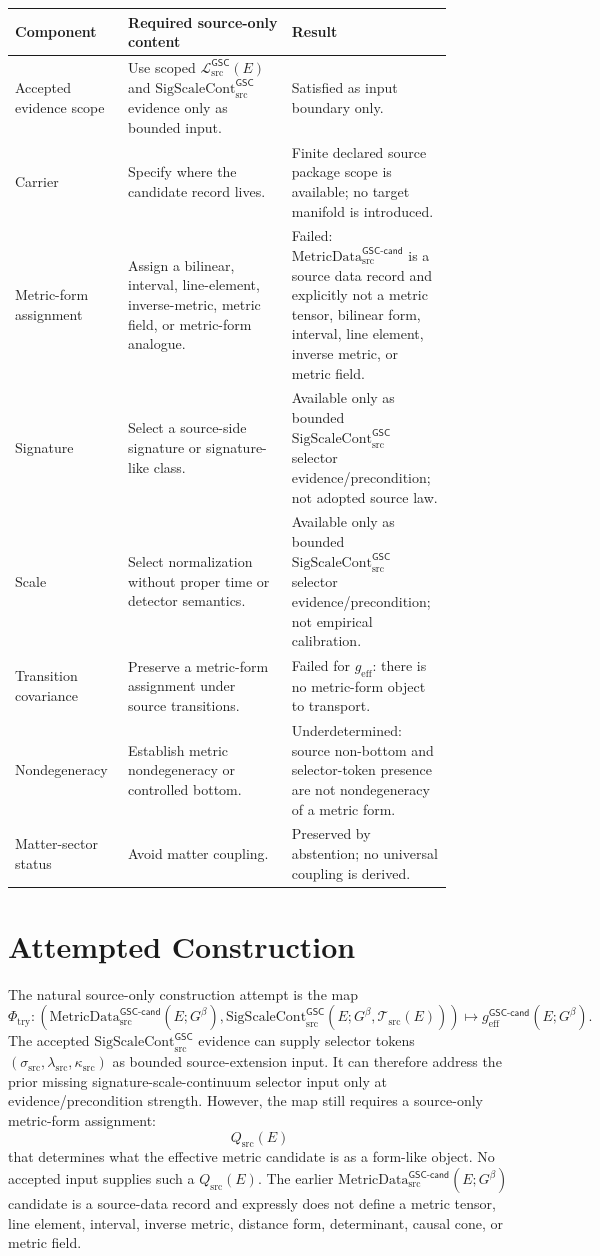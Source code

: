 \documentclass[11pt]{article}
\newcommand{\MetricDataCand}{\mathrm{MetricData}_{\mathrm{src}}^{\mathsf{GSC\mbox{-}cand}}}
\newcommand{\MetricData}{\mathcal{L}_{\mathrm{src}}^{\mathsf{GSC}}}
\newcommand{\Gbeta}{G^{\beta}}
\newcommand{\geff}{g_{\mathrm{eff}}}
\newcommand{\geffCand}{g_{\mathrm{eff}}^{\mathsf{GSC\mbox{-}cand}}}
\newcommand{\SigScaleCont}{\mathrm{SigScaleCont}_{\mathrm{src}}^{\mathsf{GSC}}}
\newcommand{\SigTok}{\sigma_{\mathrm{src}}}
\newcommand{\ScaleTok}{\lambda_{\mathrm{src}}}
\newcommand{\ContTok}{\kappa_{\mathrm{src}}}
\begin{document}
\begin{longtable}{p{0.22\linewidth}p{0.35\linewidth}p{0.30\linewidth}}
\toprule
Component & Required source-only content & Result \\
\midrule
Accepted evidence scope & Use scoped \(\MetricData(E)\) and \(\SigScaleCont\)
evidence only as bounded input. & Satisfied as input boundary only. \\
Carrier & Specify where the candidate record lives. & Finite declared source
package scope is available; no target manifold is introduced. \\
Metric-form assignment & Assign a bilinear, interval, line-element,
inverse-metric, metric field, or metric-form analogue. & Failed:
\(\MetricDataCand\) is a source data record and explicitly not a metric tensor,
bilinear form, interval, line element, inverse metric, or metric field. \\
Signature & Select a source-side signature or signature-like class. &
Available only as bounded \(\SigScaleCont\) selector evidence/precondition;
not adopted source law. \\
Scale & Select normalization without proper time or detector semantics. &
Available only as bounded \(\SigScaleCont\) selector evidence/precondition;
not empirical calibration. \\
Transition covariance & Preserve a metric-form assignment under source
transitions. & Failed for \(\geff\): there is no metric-form object to
transport. \\
Nondegeneracy & Establish metric nondegeneracy or controlled bottom. &
Underdetermined: source non-bottom and selector-token presence are not
nondegeneracy of a metric form. \\
Matter-sector status & Avoid matter coupling. & Preserved by abstention; no
universal coupling is derived. \\
\bottomrule
\end{longtable}

\section{Attempted Construction}

The natural source-only construction attempt is the map
\[
  \Phi_{\mathrm{try}}:
  \left(\MetricDataCand(E;\Gbeta),\SigScaleCont(E;\Gbeta,\mathcal T_{\mathrm{src}}(E))\right)
  \longmapsto
  \geffCand(E;\Gbeta).
\]
The accepted \(\SigScaleCont\) evidence can supply selector tokens
\((\SigTok,\ScaleTok,\ContTok)\) as bounded source-extension input. It can
therefore address the prior missing signature-scale-continuum selector input
only at evidence/precondition strength. However, the map still requires a
source-only metric-form assignment:
\[
  Q_{\mathrm{src}}(E)
\]
that determines what the effective metric candidate is as a form-like object.
No accepted input supplies such a \(Q_{\mathrm{src}}(E)\). The earlier
\(\MetricDataCand(E;\Gbeta)\) candidate is a source-data record and expressly
does not define a metric tensor, line element, interval, inverse metric,
distance form, determinant, causal cone, or metric field.
\end{document}
